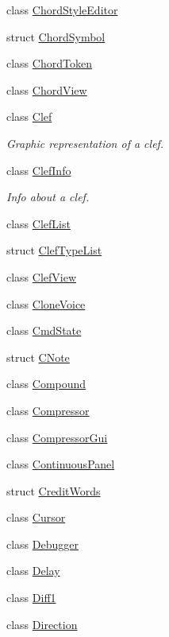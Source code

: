 \begin{DoxyCompactItemize}
class \hyperlink{class_ms_1_1_chord_style_editor}{Chord\+Style\+Editor}
\item 
struct \hyperlink{struct_ms_1_1_chord_symbol}{Chord\+Symbol}
\item 
class \hyperlink{class_ms_1_1_chord_token}{Chord\+Token}
\item 
class \hyperlink{class_ms_1_1_chord_view}{Chord\+View}
\item 
class \hyperlink{class_ms_1_1_clef}{Clef}
\begin{DoxyCompactList}\small\item\em Graphic representation of a clef. \end{DoxyCompactList}\item 
class \hyperlink{class_ms_1_1_clef_info}{Clef\+Info}
\begin{DoxyCompactList}\small\item\em Info about a clef. \end{DoxyCompactList}\item 
class \hyperlink{class_ms_1_1_clef_list}{Clef\+List}
\item 
struct \hyperlink{struct_ms_1_1_clef_type_list}{Clef\+Type\+List}
\item 
class \hyperlink{class_ms_1_1_clef_view}{Clef\+View}
\item 
class \hyperlink{class_ms_1_1_clone_voice}{Clone\+Voice}
\item 
class \hyperlink{class_ms_1_1_cmd_state}{Cmd\+State}
\item 
struct \hyperlink{struct_ms_1_1_c_note}{C\+Note}
\item 
class \hyperlink{class_ms_1_1_compound}{Compound}
\item 
class \hyperlink{class_ms_1_1_compressor}{Compressor}
\item 
class \hyperlink{class_ms_1_1_compressor_gui}{Compressor\+Gui}
\item 
class \hyperlink{class_ms_1_1_continuous_panel}{Continuous\+Panel}
\item 
struct \hyperlink{struct_ms_1_1_credit_words}{Credit\+Words}
\item 
class \hyperlink{class_ms_1_1_cursor}{Cursor}
\item 
class \hyperlink{class_ms_1_1_debugger}{Debugger}
\item 
class \hyperlink{class_ms_1_1_delay}{Delay}
\item 
class \hyperlink{class_ms_1_1_diff1}{Diff1}
\item 
class \hyperlink{class_ms_1_1_direction}{Direction}

\end{DoxyCompactItemize}
